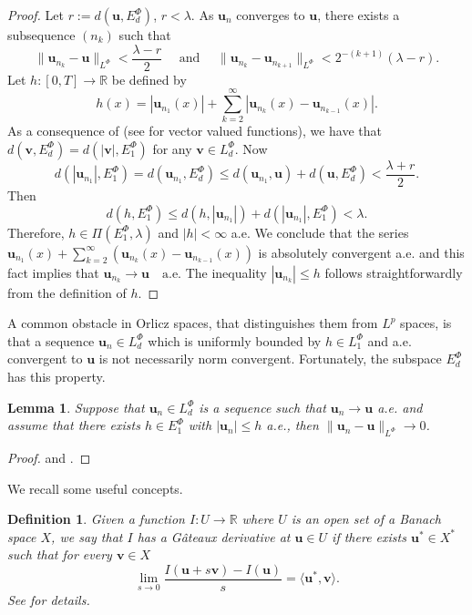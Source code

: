 \documentclass[twoside]{elsarticle}
\newtheorem{lem}[thm]{Lemma}
\newtheorem{defi}[thm]{Definition}
\theoremstyle{remark}
\newcommand{\orlnor}{\|_{L^{\Phi}}}
\newcommand{\lphi}{L^{\Phi}}
\newcommand{\ephi}{E^{\Phi}}
\renewcommand{\b}[1]{\boldsymbol{#1}}
\renewcommand{\leq}{\leqslant}
\begin{document}
\begin{proof}
Let $r:=d(\b{u},\ephi_d)$, $r<\lambda$. As $\b{u}_n$ converges to $\b{u}$, there exists a subsequence $(n_k)$ such that
\[\|\b{u}_{n_k}-\b{u}\orlnor<\frac{\lambda-r}{2}\quad \text{ and }\quad \|\b{u}_{n_k}-\b{u}_{n_{k+1}}\orlnor<2^{-(k+1)}(\lambda-r).\]
Let $h:[0,T]\rightarrow\mathbb{R}$ be  defined by
\begin{equation}\label{serie} h(x)=|\b{u}_{n_1}(x)|+\sum_{k=2}^{\infty}|\b{u}_{n_k}(x)-\b{u}_{n_{k-1}}(x)|.
\end{equation}
As a consequence  of \cite[Lemma 10.1]{KR} (see \cite[Thm. 5.5]{Orliczvectorial2005} for vector valued functions),  we have that $d(\b{v},\ephi_d)=d(|\b{v}|,\ephi_1)$ for any $\b{v}\in\lphi_d$. 
Now
\[d(|\b{u}_{n_1}|,\ephi_1)= d(\b{u}_{n_1},\ephi_d)\leq d(\b{u}_{n_1},\b{u})+d(\b{u},\ephi_d)<\frac{\lambda+r}{2}.\]
Then
\[d(h,\ephi_1)\leq d(h,|\b{u}_{n_1}|)+d(|\b{u}_{n_1}|,\ephi_1)< \lambda.\]
Therefore, $h\in\Pi(\ephi_1,\lambda)$ and  $|h|<\infty$ a.e. 
We conclude that the series  $\b{u}_{n_1}(x)+\sum_{k=2}^{\infty}(\b{u}_{n_k}(x)-\b{u}_{n_{k-1}}(x))$
is absolutely convergent a.e. and this fact implies that $\b{u}_{n_k}\rightarrow \b{u} \quad\text{a.e.}$ 
The inequality $|\b{u}_{n_k}|\leq h$ follows straightforwardly from the definition of $h$.
\end{proof}

A common obstacle in Orlicz spaces, that distinguishes them from $L^p$ spaces, is that a  sequence $\b{u}_n\in\lphi_d$ which is  uniformly bounded by $ h\in\lphi_1$ and a.e. convergent to $\b{u}$ is not necessarily norm convergent.
Fortunately, the subspace $\ephi_d$ has this property. 

\begin{lem}\label{lema_conv_may}
Suppose that $\b{u}_n \in\lphi_d$ is a sequence such that $\b{u}_n\to \b{u}$ a.e. and assume that there exists $h\in\ephi_1$ with $|\b{u}_n|\leq h$ a.e., 
then $\|\b{u}_n-\b{u}\orlnor\to 0$.
\end{lem}
\begin{proof}\cite[p. 84]{rao1991theory} and \cite[Thm. 10.3]{KR}.
\end{proof}


  We recall some useful concepts.

	\begin{defi} 
	Given a function $I:U\to\mathbb{R}$ where $U$ is an open set of a Banach space $X$,
we say that $I$ has a G\^ateaux derivative at $\b{u} \in U$ if there exists $\b{u}^*\in X^*$ such that for every $\b{v} \in X$
\[
\lim_{s \rightarrow 0}\frac{I(\b{u}+s\b{v})-I(\b{u}) }{s}=\langle \b{u}^* , \b{v}\rangle.
\]
See \cite{ambrosetti} for details. 
\end{defi}
\end{document}
